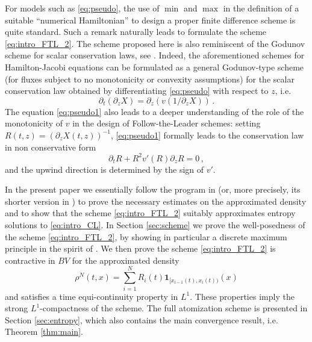 \documentclass[reqno,oneside]{amsart}
\theoremstyle{plain}
\begin{document}
For models such as \eqref{eq:pseudo}, the use of $\min$ and $\max$ in the definition of a suitable \enquote{numerical Hamiltonian} to design a proper finite difference scheme is quite standard. Such a remark naturally leads to formulate the scheme \eqref{eq:intro_FTL_2}. The scheme proposed here is also reminiscent of the Godunov scheme for scalar conservation laws, see \cite{leveque,HR_book}. Indeed, the aforementioned schemes for Hamilton-Jacobi equations can be formulated as a general Godunov-type scheme (for fluxes subject to no monotonicity or convexity assumptions) for the scalar conservation law obtained by differentiating \eqref{eq:pseudo} with respect to $z$, i.e.
\begin{equation}\label{eq:pseudo1}
    \partial_t (\partial_z X)=\partial_z \left(v(1/\partial_z X)\right)\,.
\end{equation}
The equation \eqref{eq:pseudo1} also leads to a deeper understanding of the role of the monotonicity of $v$ in the design of Follow-the-Leader schemes: setting $R(t,z)=\left(\partial_z X(t,z)\right)^{-1}$, \eqref{eq:pseudo1} formally leads to the conservation law in non conservative form
\[\partial_t R + R^2 v'(R)\partial_z R = 0\,,\]
and the upwind direction is determined by the sign of $v'$.

In the present paper we essentially follow the program in \cite{DR} (or, more precisely, its shorter version in \cite{DFR}) to prove the necessary estimates on the approximated density and to show that the scheme \eqref{eq:intro_FTL_2} suitably approximates entropy solutions to \eqref{eq:intro_CL}. In Section \ref{sec:scheme} we prove the well-posedness of the scheme \eqref{eq:intro_FTL_2}, by showing in particular a discrete maximum principle in the spirit of \cite[Lemma 1]{DR}. We then prove the scheme \eqref{eq:intro_FTL_2} is contractive in $BV$ for the approximated density
\[\rho^N(t,x)=\sum_{i=1}^N R_i(t)\mathbf{1}_{[x_{i-1}(t),x_i(t))}(x)\]
and satisfies a time equi-continuity property in $L^1$. These properties imply the strong $L^1$-compactness of the scheme. The full atomization scheme is presented in Section \ref{sec:entropy}, which also contains the main convergence result, i.e. Theorem \ref{thm:main}.
\end{document}

